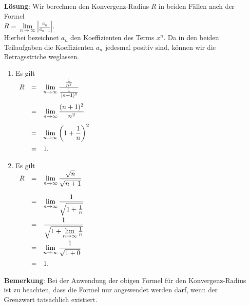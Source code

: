 \documentclass{article}
\newcounter{aufgabe}
\newcommand{\ds}{\displaystyle}
\newcommand{\solution}{\vspace*{0.2cm}

\noindent
\textbf{L\"osung}: }
\begin{document}
\solution
Wir berechnen den Konvergenz-Radius $R$ in beiden F\"allen nach der Formel
\\[0.2cm]
\hspace*{1.3cm}
$\ds R = \lim\limits_{n \rightarrow \infty} \left|\frac{a_n}{a_{n+1}}\right|$.
\\[0.2cm]
Hierbei bezeichnet $a_n$ den Koeffizienten des Terms $x^n$.  Da in den beiden Teilaufgaben die
Koeffizienten $a_n$ jedesmal positiv sind, k\"onnen wir die Betragsstriche weglassen.
\begin{enumerate}
\item Es gilt
      \\[0.2cm]
      \hspace*{1.3cm}
     $
      \begin{array}[t]{lcl}
      R & = & \ds \lim\limits_{n \rightarrow \infty} \frac{\frac{1}{n^2}}{\frac{1}{(n+1)^2}}  \\[0.6cm]
        & = & \ds \lim\limits_{n \rightarrow \infty} \frac{(n+1)^2}{n^2}                      \\[0.4cm]
        & = & \ds \lim\limits_{n \rightarrow \infty} \left(1+\frac{1}{n}\right)^2             \\[0.4cm]
        & = & 1.
      \end{array}
      $
\item Es gilt
      \\[0.2cm]
      \hspace*{1.3cm}
      $
      \begin{array}[t]{lcl}
      R & = & \ds \lim\limits_{n \rightarrow \infty} \frac{\sqrt{n}}{\sqrt{n+1}}     \\[0.6cm]
        & = & \ds \lim\limits_{n \rightarrow \infty} \frac{1}{\sqrt{1+\frac{1}{n}}}  \\[0.6cm]
        & = & \ds \frac{1}{\sqrt{1+ \lim\limits_{n \rightarrow \infty}\frac{1}{n}}}  \\[0.6cm]
        & = & \ds \lim\limits_{n \rightarrow \infty} \frac{1}{\sqrt{1+0}}            \\[0.4cm]
        & = & 1.
      \end{array}
      $
\end{enumerate}
\textbf{Bemerkung}:
Bei der Anwendung der obigen Formel f\"ur den Konvergenz-Radius ist zu beachten, dass die Formel nur
angewendet werden darf, wenn der Grenzwert tats\"achlich existiert.
\pagebreak
\end{document}
